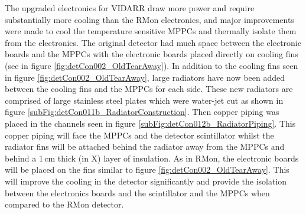 The upgraded electronics for VIDARR draw more power and require substantially more cooling than the RMon electronics, and major improvements were made to cool the temperature sensitive MPPCs and thermally isolate them from the electronics. The original detector had much space between the electronic boards and the MPPCs with the electronic boards placed directly on cooling fins (see in figure \ref{fig:detCon002_OldTearAway}). In addition to the cooling fins seen in figure \ref{fig:detCon002_OldTearAway}, large radiators have now been added between the cooling fins and the MPPCs for each side. These new radiators are comprised of large stainless steel plates which were water-jet cut as shown in figure \ref{subFig:detCon011b_RadiatorConstruction}. Then copper piping was placed in the channels seen in figure \ref{subFig:detCon012b_RadiatorPiping}. This copper piping will face the MPPCs and the detector scintillator whilst the radiator fins will be attached behind the radiator away from the MPPCs and behind a 1\,cm thick (in X) layer of insulation. As in RMon, the electronic boards will be placed on the fins similar to figure \ref{fig:detCon002_OldTearAway}. This will improve the cooling in the detector significantly and provide the isolation between the electronics boards and the scintillator and the MPPCs when compared to the RMon detector. 


